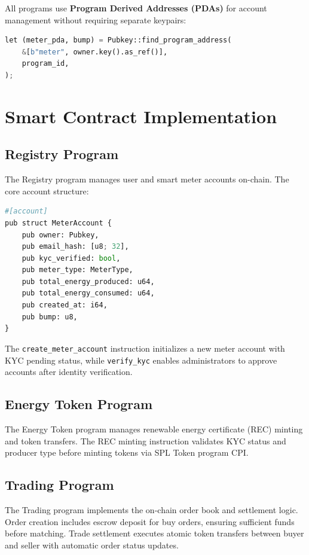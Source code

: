 \documentclass[conference]{IEEEtran}
\begin{document}
All programs use \textbf{Program Derived Addresses (PDAs)} for account management without requiring separate keypairs:

\begin{lstlisting}[language=Python, caption={PDA Derivation in Anchor}]
let (meter_pda, bump) = Pubkey::find_program_address(
    &[b"meter", owner.key().as_ref()],
    program_id,
);
\end{lstlisting}

\section{Smart Contract Implementation}

\subsection{Registry Program}

The Registry program manages user and smart meter accounts on-chain. The core account structure:

\begin{lstlisting}[language=Python, caption={MeterAccount Structure}]
#[account]
pub struct MeterAccount {
    pub owner: Pubkey,
    pub email_hash: [u8; 32],
    pub kyc_verified: bool,
    pub meter_type: MeterType,
    pub total_energy_produced: u64,
    pub total_energy_consumed: u64,
    pub created_at: i64,
    pub bump: u8,
}
\end{lstlisting}

The \texttt{create\_meter\_account} instruction initializes a new meter account with KYC pending status, while \texttt{verify\_kyc} enables administrators to approve accounts after identity verification.

\subsection{Energy Token Program}

The Energy Token program manages renewable energy certificate (REC) minting and token transfers. The REC minting instruction validates KYC status and producer type before minting tokens via SPL Token program CPI.

\subsection{Trading Program}

The Trading program implements the on-chain order book and settlement logic. Order creation includes escrow deposit for buy orders, ensuring sufficient funds before matching. Trade settlement executes atomic token transfers between buyer and seller with automatic order status updates.
\end{document}
